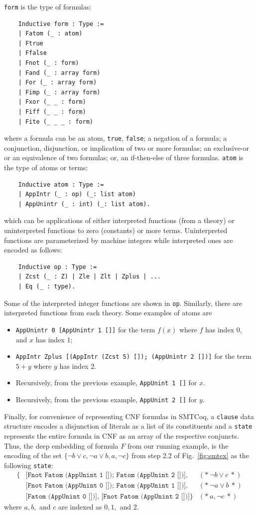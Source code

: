 \documentclass{article}
\begin{document}
	\texttt{form} is the type of 
	formulas:
	\begin{verbatim}
	Inductive form : Type :=
	| Fatom (_ : atom)
	| Ftrue
	| Ffalse
	| Fnot (_ : form)
	| Fand (_ : array form)
	| For (_ : array form)
	| Fimp (_ : array form)
	| Fxor (_ _ : form)
	| Fiff (_ _ : form)
	| Fite (_ _ _ : form)
	\end{verbatim}
	where a formula can be an atom, 
	\texttt{true}, \texttt{false};
	a negation of a formula; a 
	conjunction, disjunction, or 
	implication of two or more 
	formulas; an exclusive-or or
	an equivalence of two formulas; 
	or, an if-then-else of three formulas.
	\texttt{atom} is the type of atoms
	or terms:
	\begin{verbatim}
	Inductive atom : Type :=
	| AppIntr (_ : op) (_: list atom)
	| AppUnintr (_ : int) (_: list atom).	
	\end{verbatim} 
	which can be applications of 
	either interpreted functions 
	(from a theory) or uninterpreted
	functions to zero (constants) or more 
	terms. Uninterpreted functions 
	are parameterized by machine 
	integers while interpreted ones 
	are encoded as follows:
	\begin{verbatim}
	Inductive op : Type :=
	| Zcst (_ : Z) | Zle | Zlt | Zplus | ...
	| Eq (_ : type).
	\end{verbatim}
	Some of the interpreted integer 
	functions are shown in \texttt{op}.
	Similarly, there are interpreted 
	functions from each theory.
	Some examples of atoms are 
	\begin{itemize}
		\item \texttt{AppUnintr 0 [AppUnintr 
			1 []]} for the term $f(x)$ where 
		$f$ has index $0$, and $x$ has 
		index $1$; 
		\item \texttt{AppIntr Zplus [(AppIntr 
			(Zcst 5) []); (AppUnintr 2 [])]} 
		for the term $5 + y$ where $y$ 
		has index $2$.
		\item Recursively, from the previous example,
		\texttt{AppUnint 
			1 []} for $x$.
		\item Recursively, from the previous example,
		\texttt{AppUnint 2 []} for $y$.
	\end{itemize}
	Finally, for convenience of representing 
	CNF formulas in SMTCoq, a \texttt{clause} 
	data structure encodes a disjunction of 
	literals as a list of its constituents 
	and a \texttt{state} represents the entire 
	formula in CNF as an array of the 
	respective conjuncts. Thus, the deep 
	embedding of formula $F$ from our running 
	example, is the encoding of the set 
	$\{\neg b \lor c, \neg a \lor b, a, 
	\neg c\}$ from step 2.2 of 
	Fig.~\ref{fig:smtex} 
	as the following \texttt{state}:
	\begin{align*}
	\{&\texttt{[Fnot Fatom (AppUnint 1 []); 
		Fatom (AppUnint 2 [])],} &(*\ \neg b \lor c\ *)\\
	&\texttt{[Fnot Fatom (AppUnint 0 []);
		Fatom (AppUnint 1 [])],} &(*\ \neg a \lor b\ *)\\
	&\texttt{[Fatom (AppUnint 0 [])],
		[Fnot Fatom (AppUnint 2 [])]}\} &(*\ a, \neg c\ *)  
	\end{align*}
	where $a, b,$ and $c$ are indexed as 
	$0, 1,$ and $2$.
	
\end{document}
